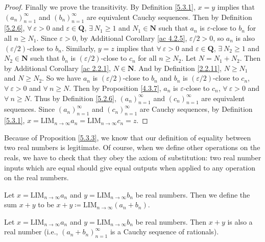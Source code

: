 \begin{proof}
    Finally we prove the transitivity.
    By Definition \ref{5.3.1}, \(x = y\) implies that \((a_n)_{n = 1}^{\infty}\) and \((b_n)_{n = 1}^{\infty}\) are equivalent Cauchy sequences.
    Then by Definition \ref{5.2.6}, \(\forall\ \varepsilon > 0\) and \(\varepsilon \in \mathbf{Q}\), \(\exists\ N_1 \geq 1\) and \(N_1 \in \mathbf{N}\) such that \(a_n\) is \(\varepsilon\)-close to \(b_n\) for all \(n \geq N_1\).
    Since \(\varepsilon > 0\), by Additional Corollary \ref{ac 4.2.5}, \(\varepsilon / 2 > 0\), so \(a_n\) is also \((\varepsilon / 2)\)-close to \(b_n\).
    Similarly, \(y = z\) implies that \(\forall\ \varepsilon > 0\) and \(\varepsilon \in \mathbf{Q}\), \(\exists\ N_2 \geq 1\) and \(N_2 \in \mathbf{N}\) such that \(b_n\) is \((\varepsilon / 2)\)-close to \(c_n\) for all \(n \geq N_2\).
    Let \(N = N_1 + N_2\).
    Then by Additional Corollary \ref{ac 2.2.1}, \(N \in \mathbf{N}\).
    And by Definition \ref{2.2.11}, \(N \geq N_1\) and \(N \geq N_2\).
    So we have \(a_n\) is \((\varepsilon / 2)\)-close to \(b_n\) and \(b_n\) is \((\varepsilon / 2)\)-close to \(c_n\), \(\forall\ \varepsilon > 0\) and \(\forall\ n \geq N\).
    Then by Proposition \ref{4.3.7}, \(a_n\) is \(\varepsilon\)-close to \(c_n\), \(\forall\ \varepsilon > 0\) and \(\forall\ n \geq N\).
    Thus by Definition \ref{5.2.6}, \((a_n)_{n = 1}^{\infty}\) and \((c_n)_{n = 1}^{\infty}\) are equivalent sequences.
    Since \((a_n)_{n = 1}^{\infty}\) and \((c_n)_{n = 1}^{\infty}\) are Cauchy sequences, by Definition \ref{5.3.1}, \(x = \text{LIM}_{n \to \infty} a_n = \text{LIM}_{n \to \infty} c_n = z\).
\end{proof}

\begin{note}
    Because of Proposition \ref{5.3.3}, we know that our definition of equality between two real numbers is legitimate.
    Of course, when we define other operations on the reals, we have to check that they obey the axiom of substitution:
    two real number inputs which are equal should give equal outputs when applied to any operation on the real numbers.
\end{note}

\begin{definition}\label{5.3.4}
    Let \(x = \text{LIM}_{n \to \infty} a_n\) and \(y = \text{LIM}_{n \to \infty} b_n\) be real numbers.
    Then we define the sum \(x + y\) to be \(x + y \coloneqq \text{LIM}_{n \to \infty} (a_n + b_n)\).
\end{definition}

\setcounter{theorem}{5}
\begin{lemma}\label{5.3.6}
    Let \(x = \text{LIM}_{n \to \infty} a_n\) and \(y = \text{LIM}_{n \to \infty} b_n\) be real numbers.
    Then \(x + y\) is also a real number
    (i.e., \((a_n + b_n)_{n = 1}^{\infty}\) is a Cauchy sequence of rationals).
\end{lemma}

